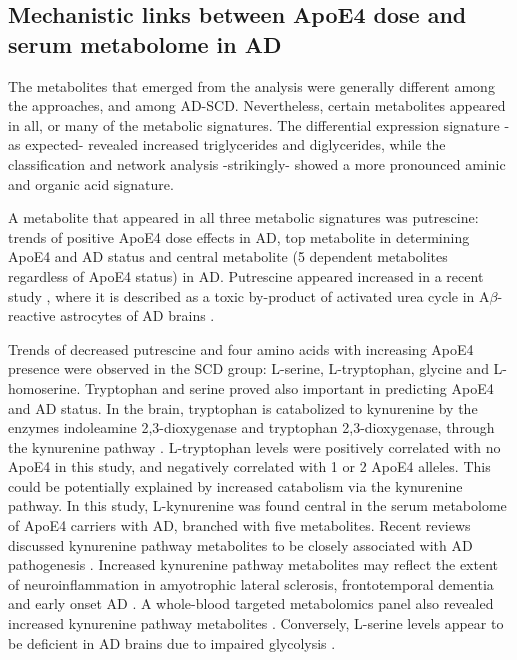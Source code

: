 \documentclass{amsart}
\begin{document}
\subsection{Mechanistic links between ApoE4 dose and serum metabolome in AD}
The metabolites that emerged from the analysis were generally different among the approaches, and among AD-SCD. Nevertheless, certain metabolites appeared in all, or many of the metabolic signatures. The differential expression signature -as expected- revealed increased triglycerides and diglycerides, while the classification and network analysis -strikingly- showed a more pronounced aminic and organic acid signature.

A metabolite that appeared in all three metabolic signatures was putrescine: trends of positive ApoE4 dose effects in AD, top metabolite in determining ApoE4 and AD status and central metabolite (5 dependent metabolites regardless of ApoE4 status) in AD. Putrescine appeared increased in a recent study \cite{Ju2021AstrocyticUC}, where it is described as a toxic by-product of activated urea cycle in A$\beta$-reactive astrocytes of AD brains \cite*{Ju2021AstrocyticUC,Wong2022PathogenicP}.

Trends of decreased putrescine and four amino acids with increasing ApoE4 presence were observed in the SCD group: L-serine, L-tryptophan, glycine and L-homoserine. Tryptophan and serine proved also important in predicting ApoE4 and AD status. In the brain, tryptophan is catabolized to kynurenine by the enzymes indoleamine 2,3-dioxygenase and tryptophan 2,3-dioxygenase, through the kynurenine pathway \cite*{Liang2022KynureninePM}. L-tryptophan levels were positively correlated with no ApoE4 in this study, and negatively correlated with 1 or 2 ApoE4 alleles. This could be potentially explained by increased catabolism via the kynurenine pathway. In this study, L-kynurenine was found central in the serum metabolome of ApoE4 carriers with AD, branched with five  metabolites. Recent reviews discussed kynurenine pathway metabolites to be closely associated with AD pathogenesis \cite{Liang2022KynureninePM,Sharma2022KynurenineMA}. Increased kynurenine pathway metabolites may reflect the extent of neuroinflammation in amyotrophic lateral sclerosis, frontotemporal dementia and early onset AD \cite*{Heylen2023BrainKP}. A whole-blood targeted metabolomics panel also revealed increased kynurenine pathway metabolites \cite{Teruya2021WholebloodMO}. Conversely, L-serine levels appear to be deficient in AD brains due to impaired glycolysis \cite{LeDouce2020ImpairmentOG}. 
\end{document}
